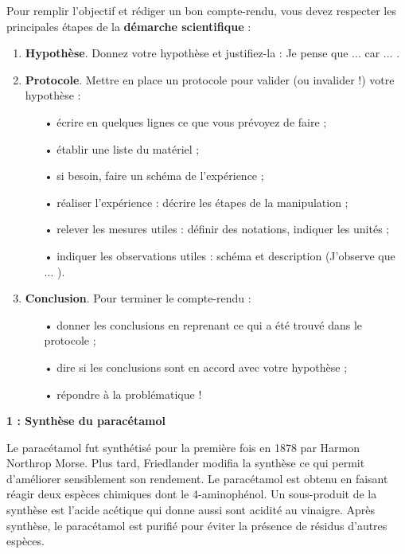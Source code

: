 \documentclass[12pt,a4paper]{article}
\begin{document}
Pour remplir l'objectif et rédiger un bon compte-rendu, vous devez respecter les principales étapes de la \textbf{démarche scientifique} :
\begin{enumerate}
\item \textbf{Hypothèse}.
Donnez votre hypothèse et justifiez-la : \og Je pense que ... car ... \fg{}.
\item \textbf{Protocole}.
Mettre en place un protocole pour valider (ou invalider !) votre hypothèse :
\begin{itemize}
\item[•] écrire en quelques lignes ce que vous prévoyez de faire ;
\item[•] établir une liste du matériel ;
\item[•] si besoin, faire un schéma de l'expérience ;
\item[•] réaliser l'expérience : décrire les étapes de la manipulation ;
\item[•] relever les mesures utiles : définir des notations, indiquer les unités ;
\item[•] indiquer les observations utiles : schéma et description (\og J'observe que ... \fg{}).
\end{itemize}
\item \textbf{Conclusion}. Pour terminer le compte-rendu :
\begin{itemize}
\item[•] donner les conclusions en reprenant ce qui a été trouvé dans le protocole ;
\item[•] dire si les conclusions sont en accord avec votre hypothèse ;
\item[•] répondre à la problématique !
\end{itemize}
\end{enumerate}

\begin{doc}
\textbf{1 : Synthèse du paracétamol}

Le paracétamol fut synthétisé pour la première fois en 1878 par Harmon Northrop Morse.
Plus tard, Friedlander modifia la synthèse ce qui permit d'améliorer sensiblement son rendement.
Le paracétamol est obtenu en faisant réagir deux espèces chimiques dont le 4-aminophénol.
Un sous-produit de la synthèse est l'acide acétique qui donne aussi sont acidité au vinaigre.
Après synthèse, le paracétamol est purifié pour éviter la présence de résidus d'autres espèces.
\end{doc}
\end{document}
